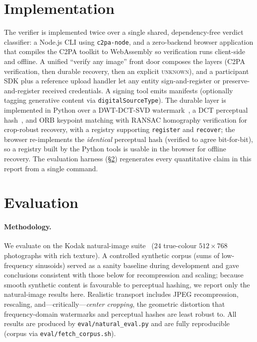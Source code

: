 \documentclass[11pt]{article}
\newcommand{\state}[1]{\textsc{#1}}
\begin{document}
\section{Implementation}
The verifier is implemented twice over a single shared, dependency-free verdict classifier:
a Node.js CLI using \texttt{c2pa-node}, and a zero-backend browser application that compiles
the C2PA toolkit to WebAssembly so verification runs client-side and offline. A unified
``verify any image'' front door composes the layers (C2PA verification, then durable
recovery, then an explicit \state{unknown}), and a participant SDK plus a reference upload
handler let any entity sign-and-register or preserve-and-register received credentials. A
signing tool emits manifests (optionally tagging generative content via
\texttt{digitalSourceType}). The durable layer is implemented in Python over a DWT-DCT-SVD
watermark~\cite{invisiblewatermark}, a DCT perceptual hash~\cite{zauner2010phash}, and ORB
keypoint matching with RANSAC homography verification for crop-robust recovery, with a
registry supporting \texttt{register} and \texttt{recover}; the browser re-implements the
\emph{identical} perceptual hash (verified to agree bit-for-bit), so a registry built by the
Python tools is usable in the browser for offline recovery. The evaluation harness
(\S\ref{sec:eval}) regenerates every quantitative claim in this report from a single command.

\section{Evaluation}\label{sec:eval}
\paragraph{Methodology.} We evaluate on the Kodak natural-image suite~\cite{kodak} ($24$ true-colour
$512\times768$ photographs with rich texture). A controlled synthetic corpus (sums of
low-frequency sinusoids) served as a sanity baseline during development and gave conclusions
consistent with those below for recompression and scaling; because smooth synthetic content
is favourable to perceptual hashing, we report only the natural-image results here. Realistic
transport includes JPEG recompression, rescaling, and---critically---\emph{center cropping},
the geometric distortion that frequency-domain watermarks and perceptual hashes are least
robust to. All results are produced by \texttt{eval/natural\_eval.py} and are fully
reproducible (corpus via \texttt{eval/fetch\_corpus.sh}).
\end{document}
